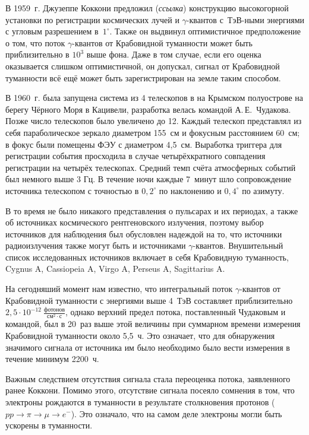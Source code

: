 \documentclass[magd,floatypics,numeref]{msudipl} %
\begin{document}
В 1959~г. Джузеппе Коккони предложил  (\textit{ссылка}) конструкцию высокогорной установки по регистрации космических лучей и $\gamma$-квантов с~ТэВ-ными энергиями с угловым разрешением в~$1^\circ$. Также он выдвинул оптимистичное предположение о том, что поток $\gamma$-квантов от Крабовидной туманности может быть приблизительно в $10^3$  выше фона. Даже в том случае, если его оценка оказывается слишком оптимистичной, он допускал, сигнал от Крабовидной туманности всё ещё может быть зарегистрирован на земле таким способом. 

В 1960~г. была запущена система из 4 телескопов в на Крымском полуострове на берегу Чёрного Моря в Кацивели, разработка велась командой А.\,Е.~Чудакова. Позже число телескопов было увеличено до 12. Каждый телескоп представлял из себя параболическое зеркало диаметром 155~см и фокусным расстоянием 60~см; в фокус были помещены ФЭУ с диаметром 4,5~см. Выработка триггера для регистрации события просходила в случае четырёхкратного совпадения регистрации на четырёх телескопах. Средний темп счёта атмосферных событий был немного выше  3 Гц. В течение ночи каждые 7~минут шло сопровождение источника телескопом с точностью в $0,2^{\circ}$ по наклонению и $0,4^{\circ}$ по азимуту.

В то время не было никакого представления о пульсарах и их периодах, а также об источниках космического рентгеновского излучения, поэтому выбор источников для наблюдения был обусловлен надеждой на то, что источники радиоизлучения также могут быть и источниками $\gamma$-квантов. Внушительный список исследованных источников включает в себя Крабовидную туманность, Cygnus A, Cassiopeia A, Virgo A, Perseus A, Sagittarius A. 

На сегодняший момент нам известно, что интегральный поток $\gamma$-квантов от Крабовидной туманности с энергиями выше 4~ТэВ составляет приблизительно~$2,5\cdot10^{-12}~\frac{\text{фотонов}}{\text{см}^2\cdot\text{с}}$, однако верхний предел потока, поставленный Чудаковым и командой, был в 20~раз выше этой величины при суммарном времени измерения Крабовидной туманности около 5,5~ч. Это означает, что для обнаружения значимого сигнала от источника им было необходимо было вести измерения в течение минимум 2200~ч.

Важным следствием отсутствия сигнала стала переоценка потока, заявленного ранее Коккони. Помимо этого, отсутствие сигнала посеяло сомнения в том, что электроны рождаются в туманности в результате столкновения протонов ($pp \rightarrow\pi\rightarrow\mu\rightarrow e^-$). Это означало, что на самом деле электроны могли быть ускорены в туманности. 
\end{document}
